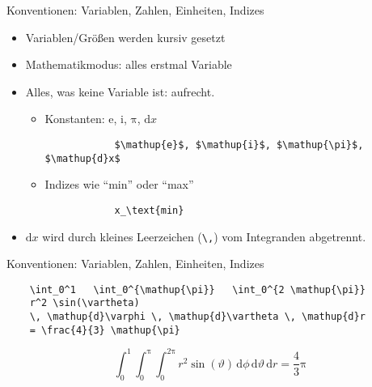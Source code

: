 \begin{frame}[fragile]{Konventionen: Variablen, Zahlen, Einheiten, Indizes}
  \begin{itemize}
    \item Variablen/Größen werden kursiv gesetzt
    \item Mathematikmodus: alles erstmal Variable
    \item Alles, was keine Variable ist: aufrecht.
      \begin{itemize}
        \item Konstanten: $\mathup{e}$, $\mathup{i}$, $\mathup{\pi}$, $\mathup{d}x$
          \medskip
          \begin{lstlisting}
            $\mathup{e}$, $\mathup{i}$, $\mathup{\pi}$, $\mathup{d}x$
          \end{lstlisting}
          \medskip
        \item Indizes wie \enquote{min} oder \enquote{max}
          \medskip
          \begin{lstlisting}
            x_\text{min}
          \end{lstlisting}
      \end{itemize}
    \item $\mathrm{d}x$ wird durch kleines Leerzeichen (\verb+\,+) vom Integranden abgetrennt.
  \end{itemize}
\end{frame}

\begin{frame}[fragile]{Konventionen: Variablen, Zahlen, Einheiten, Indizes}
  \begin{lstlisting}
    \int_0^1   \int_0^{\mathup{\pi}}   \int_0^{2 \mathup{\pi}}
    r^2 \sin(\vartheta) 
    \, \mathup{d}\varphi \, \mathup{d}\vartheta \, \mathup{d}r 
    = \frac{4}{3} \mathup{\pi}
  \end{lstlisting}

  \begin{equation*}
    \int_0^1 \int_0^{\mathup{\pi}} \int_0^{2 \mathup{\pi}}
    r^2 \sin(\vartheta) \, 
    \mathup{d}\phi \, \mathup{d}\vartheta \, \mathup{d}r 
    = \frac{4}{3} \mathup{\pi}
  \end{equation*}
\end{frame}
